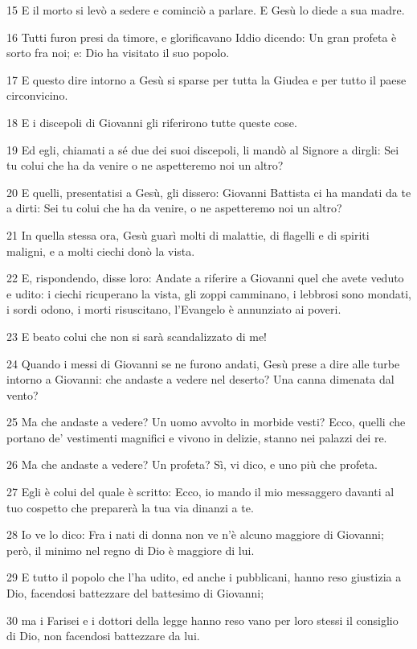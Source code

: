\par 15 E il morto si levò a sedere e cominciò a parlare. E Gesù lo diede a sua madre.
\par 16 Tutti furon presi da timore, e glorificavano Iddio dicendo: Un gran profeta è sorto fra noi; e: Dio ha visitato il suo popolo.
\par 17 E questo dire intorno a Gesù si sparse per tutta la Giudea e per tutto il paese circonvicino.
\par 18 E i discepoli di Giovanni gli riferirono tutte queste cose.
\par 19 Ed egli, chiamati a sé due dei suoi discepoli, li mandò al Signore a dirgli: Sei tu colui che ha da venire o ne aspetteremo noi un altro?
\par 20 E quelli, presentatisi a Gesù, gli dissero: Giovanni Battista ci ha mandati da te a dirti: Sei tu colui che ha da venire, o ne aspetteremo noi un altro?
\par 21 In quella stessa ora, Gesù guarì molti di malattie, di flagelli e di spiriti maligni, e a molti ciechi donò la vista.
\par 22 E, rispondendo, disse loro: Andate a riferire a Giovanni quel che avete veduto e udito: i ciechi ricuperano la vista, gli zoppi camminano, i lebbrosi sono mondati, i sordi odono, i morti risuscitano, l'Evangelo è annunziato ai poveri.
\par 23 E beato colui che non si sarà scandalizzato di me!
\par 24 Quando i messi di Giovanni se ne furono andati, Gesù prese a dire alle turbe intorno a Giovanni: che andaste a vedere nel deserto? Una canna dimenata dal vento?
\par 25 Ma che andaste a vedere? Un uomo avvolto in morbide vesti? Ecco, quelli che portano de' vestimenti magnifici e vivono in delizie, stanno nei palazzi dei re.
\par 26 Ma che andaste a vedere? Un profeta? Sì, vi dico, e uno più che profeta.
\par 27 Egli è colui del quale è scritto: Ecco, io mando il mio messaggero davanti al tuo cospetto che preparerà la tua via dinanzi a te.
\par 28 Io ve lo dico: Fra i nati di donna non ve n'è alcuno maggiore di Giovanni; però, il minimo nel regno di Dio è maggiore di lui.
\par 29 E tutto il popolo che l'ha udito, ed anche i pubblicani, hanno reso giustizia a Dio, facendosi battezzare del battesimo di Giovanni;
\par 30 ma i Farisei e i dottori della legge hanno reso vano per loro stessi il consiglio di Dio, non facendosi battezzare da lui.
